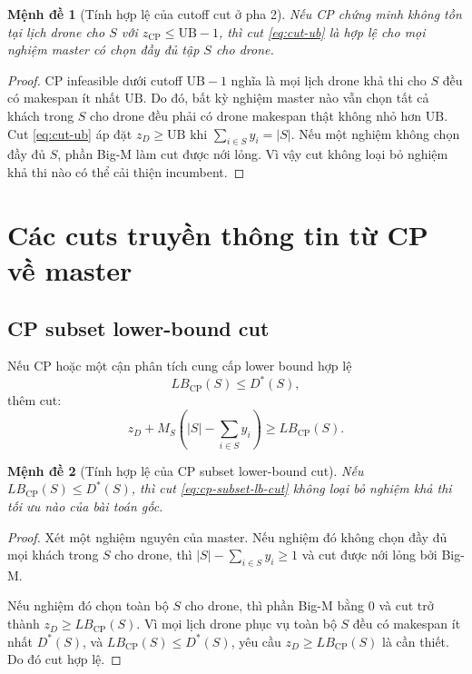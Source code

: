 \documentclass[12pt,a4paper]{article}
\newtheorem{proposition}{Mệnh đề}
\newcommand{\UB}{\mathrm{UB}}
\begin{document}
\begin{proposition}[Tính hợp lệ của cutoff cut ở pha 2]
Nếu CP chứng minh không tồn tại lịch drone cho $S$ với $z_{\mathrm{CP}}\le \UB-1$, thì cut \eqref{eq:cut-ub} là hợp lệ cho mọi nghiệm master có chọn đầy đủ tập $S$ cho drone.
\end{proposition}
\begin{proof}
CP infeasible dưới cutoff $\UB-1$ nghĩa là mọi lịch drone khả thi cho $S$ đều có makespan ít nhất $\UB$. Do đó, bất kỳ nghiệm master nào vẫn chọn tất cả khách trong $S$ cho drone đều phải có drone makespan thật không nhỏ hơn $\UB$. Cut \eqref{eq:cut-ub} áp đặt $z_D\ge \UB$ khi $\sum_{i\in S}y_i=|S|$. Nếu một nghiệm không chọn đầy đủ $S$, phần Big-M làm cut được nới lỏng. Vì vậy cut không loại bỏ nghiệm khả thi nào có thể cải thiện incumbent.
\end{proof}

\section{Các cuts truyền thông tin từ CP về master}
\label{sec:cuts}

\subsection{CP subset lower-bound cut}

Nếu CP hoặc một cận phân tích cung cấp lower bound hợp lệ
\[
    LB_{\mathrm{CP}}(S)\le D^*(S),
\]
thêm cut:
\begin{equation}
    z_D+M_S\left(|S|-\sum_{i\in S}y_i\right)
    \ge LB_{\mathrm{CP}}(S).
    \label{eq:cp-subset-lb-cut}
\end{equation}

\begin{proposition}[Tính hợp lệ của CP subset lower-bound cut]
Nếu $LB_{\mathrm{CP}}(S)\le D^*(S)$, thì cut \eqref{eq:cp-subset-lb-cut} không loại bỏ nghiệm khả thi tối ưu nào của bài toán gốc.
\end{proposition}
\begin{proof}
Xét một nghiệm nguyên của master. Nếu nghiệm đó không chọn đầy đủ mọi khách trong $S$ cho drone, thì $|S|-\sum_{i\in S}y_i\ge 1$ và cut được nới lỏng bởi Big-M.

Nếu nghiệm đó chọn toàn bộ $S$ cho drone, thì phần Big-M bằng 0 và cut trở thành $z_D\ge LB_{\mathrm{CP}}(S)$. Vì mọi lịch drone phục vụ toàn bộ $S$ đều có makespan ít nhất $D^*(S)$, và $LB_{\mathrm{CP}}(S)\le D^*(S)$, yêu cầu $z_D\ge LB_{\mathrm{CP}}(S)$ là cần thiết. Do đó cut hợp lệ.
\end{proof}
\end{document}

